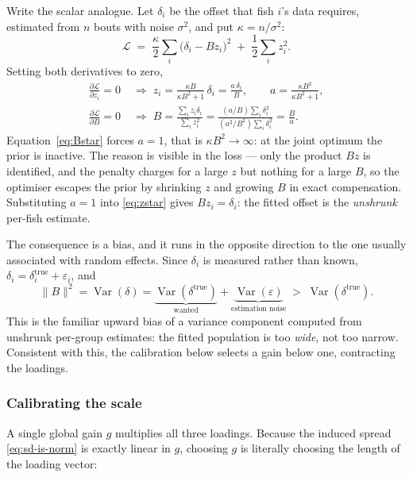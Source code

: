 Write the scalar analogue. Let $\delta_i$ be the offset that fish $i$'s data
requires, estimated from $n$ bouts with noise $\sigma^2$, and put
$\kappa=n/\sigma^2$:
\begin{equation}
\mathcal{L} \;=\; \frac{\kappa}{2}\sum_i\bigl(\delta_i-Bz_i\bigr)^2
              \;+\; \frac{1}{2}\sum_i z_i^2 .
\end{equation}
Setting both derivatives to zero,
\begin{align}
\frac{\partial\mathcal{L}}{\partial z_i}=0
  &\;\Longrightarrow\;
  z_i=\frac{\kappa B}{\kappa B^2+1}\,\delta_i=\frac{a\,\delta_i}{B},
  \qquad a=\frac{\kappa B^2}{\kappa B^2+1},
  \label{eq:zstar}\\[2pt]
\frac{\partial\mathcal{L}}{\partial B}=0
  &\;\Longrightarrow\;
  B=\frac{\sum_i z_i\delta_i}{\sum_i z_i^2}
   =\frac{(a/B)\sum_i\delta_i^2}{(a^2/B^2)\sum_i\delta_i^2}
   =\frac{B}{a}.
  \label{eq:Bstar}
\end{align}
Equation~\eqref{eq:Bstar} forces $a=1$, that is $\kappa B^2\to\infty$: at the
joint optimum the prior is inactive. The reason is visible in the loss --- only
the product $Bz$ is identified, and the penalty charges for a large $z$ but
nothing for a large $B$, so the optimiser escapes the prior by shrinking $z$
and growing $B$ in exact compensation. Substituting $a=1$ into
\eqref{eq:zstar} gives $Bz_i=\delta_i$: the fitted offset is the
\emph{unshrunk} per-fish estimate.

The consequence is a bias, and it runs in the opposite direction to the one
usually associated with random effects. Since $\delta_i$ is measured rather
than known, $\delta_i=\delta_i^{\text{true}}+\varepsilon_i$, and
\begin{equation}
\lVert B\rVert^2=\operatorname{Var}(\delta)
 =\underbrace{\operatorname{Var}(\delta^{\text{true}})}_{\text{wanted}}
 +\underbrace{\operatorname{Var}(\varepsilon)}_{\text{estimation noise}}
 \;>\;\operatorname{Var}(\delta^{\text{true}}) .
\end{equation}
This is the familiar upward bias of a variance component computed from
unshrunk per-group estimates: the fitted population is too \emph{wide}, not too
narrow. Consistent with this, the calibration below selects a gain below one,
contracting the loadings.

\subsubsection{Calibrating the scale}

A single global gain $g$ multiplies all three loadings. Because the induced
spread \eqref{eq:sd-is-norm} is exactly linear in $g$, choosing $g$ is
literally choosing the length of the loading vector:


